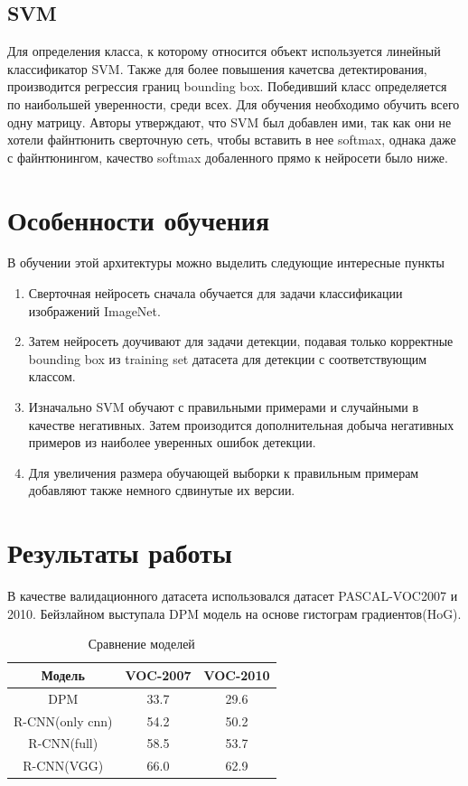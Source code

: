 \documentclass{article}
\begin{document}
    \subsection{SVM}
    Для определения класса, к которому относится объект используется линейный классификатор SVM. Также для более повышения качетсва детектирования, производится регрессия границ bounding box. Победивший класс определяется по наибольшей уверенности, среди всех. Для обучения необходимо обучить всего одну матрицу. Авторы утверждают, что SVM был добавлен ими, так как они не хотели файнтюнить сверточную сеть, чтобы вставить в нее softmax, однака даже с файнтюнингом, качество softmax добаленного прямо к нейросети было ниже.
	\section{Особенности обучения}
	В обучении этой  архитектуры можно выделить следующие интересные пункты
	\begin{enumerate}
	    \item Сверточная нейросеть сначала обучается для задачи классификации изображений ImageNet.
	    \item Затем нейросеть доучивают для задачи детекции, подавая только корректные bounding box из training set датасета для детекции с соответствующим классом.
	    \item Изначально SVM обучают с правильными примерами и случайными в качестве негативных. Затем произодится дополнительная добыча негативных примеров из наиболее уверенных ошибок детекции.
	    \item Для увеличения размера обучающей выборки к правильным примерам добавляют также немного сдвинутые их версии.
	\end{enumerate}
	\section{Результаты работы}
	В качестве валидационного  датасета использовался датасет  PASCAL-VOC2007 и 2010.
	Бейзлайном выступала DPM модель на основе гистограм градиентов(HoG).
	\begin{table}[H]
	    \centering
	    \begin{tabular}{|c|c|c|}
	    \hline
	         Модель & VOC-2007 & VOC-2010  \\ \hline
	         DPM & 33.7 & 29.6  \\ \hline
	         R-CNN(only cnn) & 54.2 & 50.2  \\ \hline
	         R-CNN(full) & 58.5 & 53.7  \\ \hline
	         R-CNN(VGG) & 66.0 & 62.9  \\ \hline
	    \end{tabular}
	    \caption{Сравнение моделей}
	\end{table}
	
\end{document}
